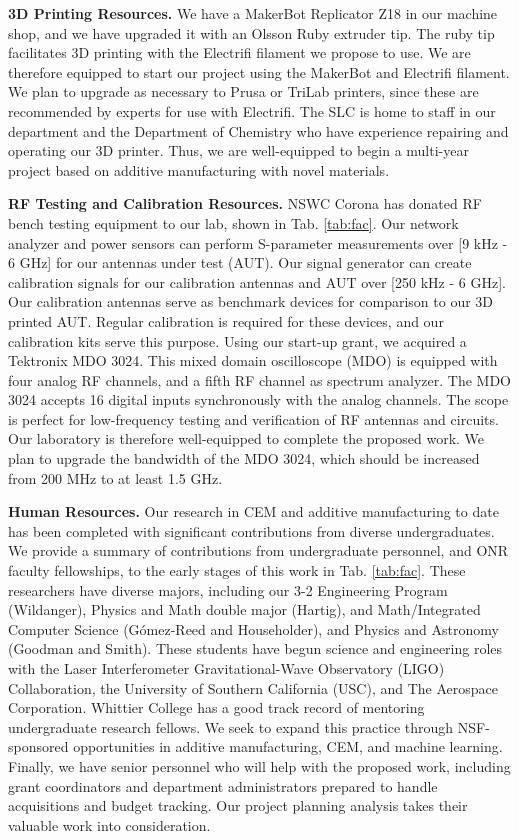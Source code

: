 \documentclass[11pt]{amsart}
\begin{document}
\textbf{3D Printing Resources.}  We have a MakerBot Replicator Z18 in our machine shop, and we have upgraded it with an Olsson Ruby extruder tip.  The ruby tip facilitates 3D printing with the Electrifi filament we propose to use.  We are therefore equipped to start our project using the MakerBot and Electrifi filament.  We plan to upgrade as necessary to Prusa or TriLab printers, since these are recommended by experts for use with Electrifi.  The SLC is home to staff in our department and the Department of Chemistry who have experience repairing and operating our 3D printer.  Thus, we are well-equipped to begin a multi-year project based on additive manufacturing with novel materials. 

\textbf{RF Testing and Calibration Resources.}  NSWC Corona has donated RF bench testing equipment to our lab, shown in Tab. \ref{tab:fac}.  Our network analyzer and power sensors can perform S-parameter measurements over [9 kHz - 6 GHz] for our antennas under test (AUT).  Our signal generator can create calibration signals for our calibration antennas and AUT over [250 kHz - 6 GHz].  Our calibration antennas serve as benchmark devices for comparison to our 3D printed AUT.  Regular calibration is required for these devices, and our calibration kits serve this purpose.  Using our start-up grant, we acquired a Tektronix MDO 3024.  This mixed domain oscilloscope (MDO) is equipped with four analog RF channels, and a fifth RF channel as spectrum analyzer.  The MDO 3024 accepts 16 digital inputs synchronously with the analog channels.  The scope is perfect for low-frequency testing and verification of RF antennas and circuits.  Our laboratory is therefore well-equipped to complete the proposed work.  We plan to upgrade the bandwidth of the MDO 3024, which should be increased from 200 MHz to at least 1.5 GHz.

\textbf{Human Resources.} Our research in CEM and additive manufacturing to date has been completed with significant contributions from diverse undergraduates.  We provide a summary of contributions from undergraduate personnel, and ONR faculty fellowships, to the early stages of this work in Tab. \ref{tab:fac}.  These researchers have diverse majors, including our 3-2 Engineering Program (Wildanger), Physics and Math double major (Hartig), and Math/Integrated Computer Science (G\'{o}mez-Reed and Householder), and Physics and Astronomy (Goodman and Smith).   These students have begun science and engineering roles with the Laser Interferometer Gravitational-Wave Observatory (LIGO) Collaboration, the University of Southern California (USC), and The Aerospace Corporation.  Whittier College has a good track record of mentoring undergraduate research fellows.  We seek to expand this practice through NSF-sponsored opportunities in additive manufacturing, CEM, and machine learning.  Finally, we have senior personnel who will help with the proposed work, including grant coordinators and department administrators prepared to handle acquisitions and budget tracking.  Our project planning analysis takes their valuable work into consideration.
\end{document}
